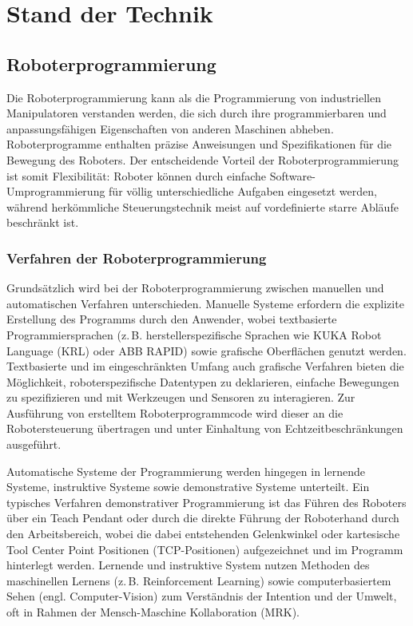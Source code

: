 \chapter{Stand der Technik} \label{cap:Grundlagen}

\section{Roboterprogrammierung}
Die Roboterprogrammierung kann als die
Programmierung von industriellen Manipulatoren verstanden werden, die sich durch
ihre programmierbaren und anpassungsfähigen Eigenschaften von anderen Maschinen
abheben. Roboterprogramme enthalten präzise Anweisungen und Spezifikationen für
die Bewegung des Roboters. Der entscheidende
Vorteil der Roboterprogrammierung ist somit Flexibilität: Roboter
können durch einfache Software-Umprogrammierung für völlig unterschiedliche
Aufgaben eingesetzt werden, während herkömmliche Steuerungstechnik meist auf
vordefinierte starre Abläufe beschränkt ist.

\subsection{Verfahren der Roboterprogrammierung}
Grundsätzlich wird bei der Roboterprogrammierung zwischen manuellen und
automatischen Verfahren unterschieden.
Manuelle Systeme erfordern die explizite Erstellung des Programms
durch den Anwender, wobei textbasierte Programmiersprachen (z.\,B.
  herstellerspezifische Sprachen wie KUKA Robot Language (KRL) oder ABB
RAPID) sowie grafische Oberflächen genutzt werden. Textbasierte und
im eingeschränkten Umfang auch grafische Verfahren bieten
die Möglichkeit, roboterspezifische
Datentypen zu deklarieren, einfache Bewegungen zu spezifizieren und
mit Werkzeugen und Sensoren zu interagieren. Zur Ausführung von
erstelltem Roboterprogrammcode wird dieser an die Robotersteuerung übertragen
und unter Einhaltung von Echtzeitbeschränkungen
ausgeführt.

Automatische Systeme der Programmierung werden hingegen in
lernende Systeme, instruktive Systeme sowie demonstrative Systeme
unterteilt. Ein typisches Verfahren demonstrativer Programmierung ist das
Führen des Roboters über ein Teach Pendant oder durch die direkte
Führung der Roboterhand durch den Arbeitsbereich, wobei die dabei
entstehenden Gelenkwinkel oder
kartesische Tool Center Point Positionen (TCP-Positionen)
aufgezeichnet und im Programm hinterlegt werden. Lernende und instruktive System
nutzen Methoden des maschinellen Lernens (z.\,B. Reinforcement Learning) sowie
computerbasiertem Sehen (engl. Computer-Vision) zum Verständnis der Intention
und der Umwelt, oft in Rahmen der Mensch-Maschine Kollaboration
(MRK).

